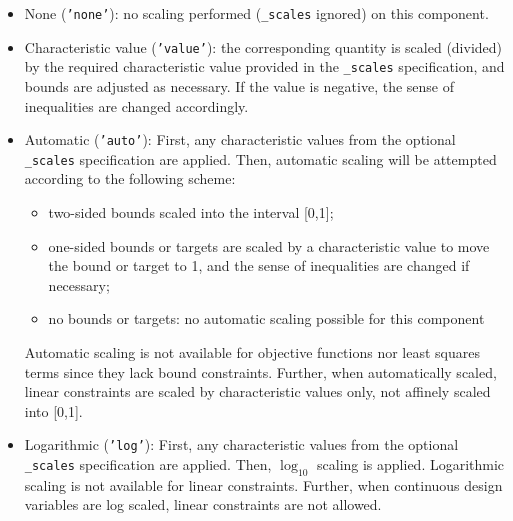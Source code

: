 \begin{itemize}

\item None ({\tt 'none'}): no scaling performed ({\tt *\_scales}
ignored) on this component.

\item Characteristic value ({\tt 'value'}): the corresponding quantity
  is scaled (divided) by the required characteristic value provided in
  the {\tt *\_scales} specification, and bounds are adjusted as
  necessary. If the value is negative, the sense of inequalities are
  changed accordingly.

\item Automatic ({\tt 'auto'}): First, any characteristic values from
  the optional {\tt *\_scales} specification are applied. Then,
  automatic scaling will be attempted according to the following
  scheme:

  \begin{itemize}
  
  \item two-sided bounds scaled into the interval [0,1];
	
  \item one-sided bounds or targets are scaled by a characteristic
    value to move the bound or target to 1, and the sense of
    inequalities are changed if necessary;

  \item no bounds or targets: no automatic scaling possible for this component
    
  \end{itemize}

  Automatic scaling is not available for objective functions nor least
  squares terms since they lack bound constraints. Further, when
  automatically scaled, linear constraints are scaled by
  characteristic values only, not affinely scaled into [0,1].

\item Logarithmic ({\tt 'log'}): First, any characteristic values from
  the optional {\tt *\_scales} specification are applied. Then,
  $\log_{10}$ scaling is applied. Logarithmic scaling is not available
  for linear constraints. Further, when continuous design variables
  are log scaled, linear constraints are not allowed.

\end{itemize}

